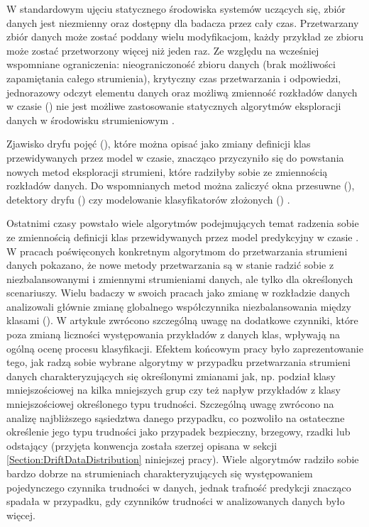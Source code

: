 W standardowym ujęciu statycznego środowiska systemów uczących się, zbiór danych jest niezmienny oraz dostępny dla badacza przez cały czas. Przetwarzany zbiór danych może zostać poddany wielu modyfikacjom, każdy przykład ze zbioru może zostać przetworzony więcej niż jeden raz. Ze względu na wcześniej wspomniane ograniczenia: nieograniczoność zbioru danych (brak możliwości zapamiętania całego strumienia), krytyczny czas przetwarzania i odpowiedzi, jednorazowy odczyt elementu danych oraz możliwą zmienność rozkładów danych w czasie () nie jest możliwe zastosowanie statycznych algorytmów eksploracji danych w środowisku strumieniowym \cite{Article:TradDataStream}\cite{Prezentacja:Strumienie}.

Zjawisko dryfu pojęć (), które można opisać jako zmiany definicji klas przewidywanych przez model w czasie, znacząco przyczyniło się do powstania nowych metod eksploracji strumieni, które radziłyby sobie ze zmiennością rozkładów danych. Do wspomnianych metod można zaliczyć okna przesuwne (), detektory dryfu () czy modelowanie klasyfikatorów złożonych () \cite{DBrzezinski}.

Ostatnimi czasy powstało wiele algorytmów podejmujących temat radzenia sobie ze zmiennością definicji klas przewidywanych przez model predykcyjny w czasie \cite{BrzezPhd2015}\cite{Article:ManyAlgorithms}\cite{Article:OBFirst}\cite{Article:OBSecond}. W pracach poświęconych konkretnym algorytmom do przetwarzania strumieni danych pokazano, że nowe metody przetwarzania są w stanie radzić sobie z niezbalansowanymi i zmiennymi strumieniami danych, ale tylko dla określonych scenariuszy. Wielu badaczy w swoich pracach jako zmianę w rozkładzie danych analizowali głównie zmianę globalnego współczynnika niezbalansowania między klasami (). W artykule \cite{Article:TypyPrzykladow} zwrócono szczególną uwagę na dodatkowe czynniki, które poza zmianą liczności występowania przykładów z danych klas, wpływają na ogólną ocenę procesu klasyfikacji. Efektem końcowym pracy było zaprezentowanie tego, jak radzą sobie wybrane algorytmy w przypadku przetwarzania strumieni danych charakteryzujących się określonymi zmianami jak, np. podział klasy mniejszościowej na kilka mniejszych grup czy też napływ przykładów z klasy mniejszościowej określonego typu trudności. Szczególną uwagę zwrócono na analizę najbliższego sąsiedztwa danego przypadku, co pozwoliło na ostateczne określenie jego typu trudności jako przypadek bezpieczny, brzegowy, rzadki lub odstający (przyjęta konwencja została szerzej opisana w sekcji \ref{Section:DriftDataDistribution} niniejszej pracy). Wiele algorytmów radziło sobie bardzo dobrze na strumieniach charakteryzujących się występowaniem pojedynczego czynnika trudności w danych, jednak trafność predykcji znacząco spadała w przypadku, gdy czynników trudności w analizowanych danych było więcej.

